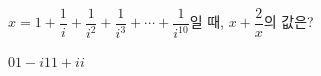 $x=1+\dfrac{1}{i}+\dfrac{1}{i^2}+\dfrac{1}{i^3}+\cdots+\dfrac{1}{i^{10}}$일 때, $x+\dfrac{2}{x}$의 값은?
\begin{choices32}{$0$}{$1-i$}{$1$}{$1+i$}{$i$}\end{choices32}
